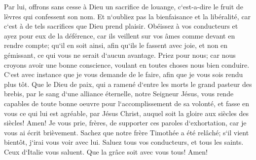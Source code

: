 \verse Par lui, offrons sans cesse à Dieu un sacrifice de louange, c`est-a-dire le fruit de lèvres qui confessent son nom. 
\verse Et n`oubliez pas la bienfaisance et la libéralité, car c`est à de tels sacrifices que Dieu prend plaisir. 
\verse Obéissez à vos conducteurs et ayez pour eux de la déférence, car ils veillent sur vos âmes comme devant en rendre compte; qu`il en soit ainsi, afin qu`ils le fassent avec joie, et non en gémissant, ce qui vous ne serait d`aucun avantage. 
\verse Priez pour nous; car nous croyons avoir une bonne conscience, voulant en toutes choses nous bien conduire. 
\verse C`est avec instance que je vous demande de le faire, afin que je vous sois rendu plus tôt. 
\verse Que le Dieu de paix, qui a ramené d`entre les morts le grand pasteur des brebis, par le sang d`une alliance éternelle, notre Seigneur Jésus, 
\verse vous rende capables de toute bonne oeuvre pour l`accomplissement de sa volonté, et fasse en vous ce qui lui est agréable, par Jésus Christ, auquel soit la gloire aux siècles des siècles! Amen! 
\verse Je vous prie, frères, de supporter ces paroles d`exhortation, car je vous ai écrit brièvement. 
\verse Sachez que notre frère Timothée a été relâché; s`il vient bientôt, j`irai vous voir avec lui. 
\verse Saluez tous vos conducteurs, et tous les saints. Ceux d`Italie vous saluent. 
\verse Que la grâce soit avec vous tous! Amen! 
